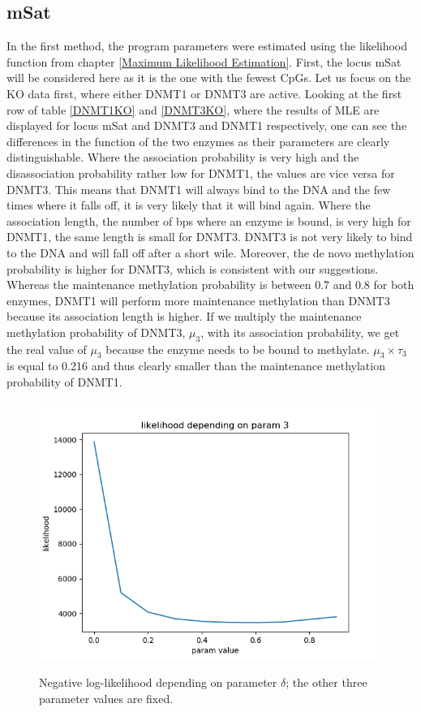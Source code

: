 \subsection{mSat}
\label{mSat}
In the first method, the program parameters were estimated using the likelihood function from chapter \ref{Maximum Likelihood Estimation}. First, the locus mSat will be considered here as it is the one with the fewest \acp{CpG}. Let us focus on the \ac{KO} data first, where either DNMT1 or DNMT3 are active. Looking at the first row of table \ref{DNMT1KO} and \ref{DNMT3KO}, where the results of \acf{MLE} are displayed for locus mSat and DNMT3 and DNMT1 respectively, one can see the differences in the function of the two enzymes as their parameters are clearly distinguishable. Where the association probability is very high and the disassociation probability rather low for DNMT1, the values are vice versa for DNMT3. This means that DNMT1 will always bind to the DNA and the few times where it falls off, it is very likely that it will bind again.\newline
Where the association length, the number of \acfp{bp} where an enzyme is bound, is very high for DNMT1, the same length is small for DNMT3. DNMT3 is not very likely to bind to the DNA and will fall off after a short wile. Moreover, the de novo methylation probability is higher for DNMT3, which is consistent with our suggestions. Whereas the maintenance methylation probability is between 0.7 and 0.8 for both enzymes, DNMT1 will perform more maintenance methylation than DNMT3 because its association length is higher. If we multiply the maintenance methylation probability of DNMT3, $\mu_3$, with its association probability, we get the real value of $\mu_3$ because the enzyme needs to be bound to methylate. $\mu_3 \times \tau_3$ is equal to 0.216 and thus clearly smaller than the maintenance methylation probability of DNMT1.
\begin{figure}[h]
\includegraphics[scale=0.7]{../likelihoodPlot3DNMT3KO.png}
\label{rangedelta}
\caption{Negative log-likelihood depending on parameter $\delta$; the other three parameter values are fixed.}
\end{figure}

